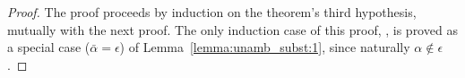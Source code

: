 {\centering
{}}
\begin{proof}
The proof proceeds by induction on the theorem's third hypothesis, mutually with the next proof.
The only induction case of this proof, , is proved as a special case
($\bar{\alpha} = \epsilon$) of Lemma~\ref{lemma:unamb_subst:1}, since naturally
$\alpha\notin\epsilon$.
\end{proof}

